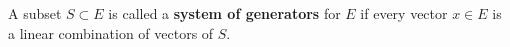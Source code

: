 A subset $S \subset E$ is called a \textbf{system of generators} for $E$ if every vector $x \in E$ is a linear combination of vectors of $S$.
